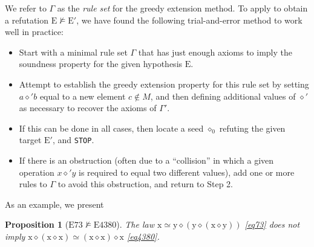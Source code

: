 \documentclass[12pt]{amsart}
\newtheorem{proposition}[theorem]{Proposition}
\theoremstyle{definition}
\newcommand{\x}{\mathrm{x}}
\newcommand{\y}{\mathrm{y}}
\newcommand{\op}{\diamond}
\newcommand{\formaleq}{\simeq}
\newcommand{\nmodels}{\not\models}
\newcommand{\Eq}[1]{\mathrm{E}#1}
\newcommand{\E}{\mathrm{E}}
\begin{document}
We refer to $\Gamma$ as the \emph{rule set} for the greedy extension method. To apply  to obtain a refutation $\E \nmodels {\E'}$, we have found the following trial-and-error method to work well in practice:
\begin{itemize}
\item[1.] Start with a minimal rule set $\Gamma$ that has just enough axioms to imply the soundness property for the given hypothesis $\E$.
\item[2.] Attempt to establish the greedy extension property for this rule set by setting $a \op' b$ equal to a new element $c \not \in M$, and then defining additional values of $\op'$ as necessary to recover the axioms of $\Gamma'$.
\item[3.]  If this can be done in all cases, then locate a seed $\op_0$ refuting the given target ${\E'}$, and \texttt{STOP}.
\item[4.]  If there is an obstruction (often due to a ``collision'' in which a given operation $x \op' y$ is required to equal two different values), add one or more rules to $\Gamma$ to avoid this obstruction, and return to Step 2.
\end{itemize}

As an example, we present

\begin{proposition}[$\Eq{73} \nmodels \Eq{4380}$]\label{73-4380} The law $\x \formaleq \y \op (\y \op (\x \op \y))$ \eqref{eq73} does not imply $\x \op (\x \op \x) \formaleq (\x \op \x) \op \x$ \eqref{eq4380}.
\end{proposition}
\end{document}
